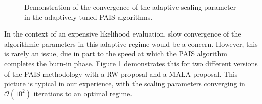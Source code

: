 \documentclass[final]{siamltex}
\begin{document}
\begin{figure}[!htb]
\centering
{}
\caption{Demonstration of the convergence of the adaptive scaling parameter in the adaptively tuned PAIS algorithms.}
\label{fig:G1_adapt_trace_PAIS}
\end{figure}

In the context of an expensive likelihood evaluation, slow convergence
of the algorithmic parameters in this adaptive regime would be a
concern. However, this is rarely an issue, due in part to the speed at
which the PAIS algorithm completes the burn-in phase. Figure
\ref{fig:G1_adapt_trace_PAIS} demonstrates this for two different
versions of the PAIS methodology with a RW proposal and a MALA\cite{roberts1998optimal}
proposal. This picture is typical in our experience, with the scaling
parameters converging in $\mathcal{O}(10^2)$ iterations to an optimal regime.
\end{document}

